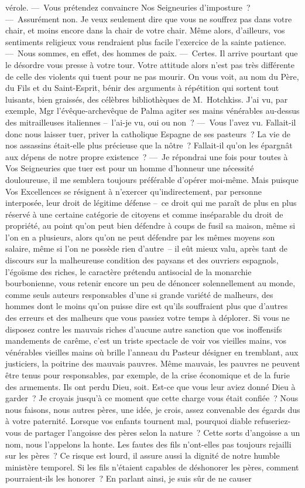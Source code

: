 \documentclass[french,twoside]{book} %
\begin{document}
vérole. — Vous prétendez convaincre Nos Seigneuries d’imposture ? — Assurément non. Je veux seulement dire que vous ne souffrez pas dans votre chair, et moins encore dans la chair de votre chair. Même alors, d’ailleurs, vos sentiments religieux vous rendraient plus facile l’exercice de la sainte patience. — Nous sommes, en effet, des hommes de paix. — Certes. Il arrive pourtant que le désordre vous presse à votre tour. Votre attitude alors n’est pas très différente de celle des violents qui tuent pour ne pas mourir. On vous voit, au nom du Père, du Fils et du Saint-Esprit, bénir des arguments à répétition qui sortent tout luisants, bien graissés, des célèbres bibliothèques de M. Hotchkiss. J’ai vu, par exemple, Mgr l’évêque-archevêque de Palma agiter ses mains vénérables au-dessus des mitrailleuses italiennes – l’ai-je vu, oui ou non ? — Vous l’avez vu. Fallait-il donc nous laisser tuer, priver la catholique Espagne de ses pasteurs ? La vie de nos assassins était-elle plus précieuse que la nôtre ? Fallait-il qu’on les épargnât aux dépens de notre propre existence ? — Je répondrai une fois pour toutes à Vos Seigneuries que tuer est pour un homme d’honneur une nécessité douloureuse, il me semblera toujours préférable d’opérer moi-même. Mais puisque Vos Excellences se résignent à n’exercer qu’indirectement, par personne interposée, leur droit de légitime défense – ce droit qui me paraît de plus en plus réservé à une certaine catégorie de citoyens et comme inséparable du droit de propriété, au point qu’on peut bien défendre à coups de fusil sa maison, même si l’on en a plusieurs, alors qu’on ne peut défendre par les mêmes moyens son salaire, même si l’on ne possède rien d’autre – il eût mieux valu, après tant de discours sur la malheureuse condition des paysans et des ouvriers espagnols, l’égoïsme des riches, le caractère prétendu antisocial de la monarchie bourbonienne, vous retenir encore un peu de dénoncer solennellement au monde, comme seuls auteurs responsables d’une si grande variété de malheurs, des hommes dont le moins qu’on puisse dire est qu’ils souffraient plus que d’autres des erreurs et des malheurs que vous passiez votre temps à déplorer. Si vous ne disposez contre les mauvais riches d’aucune autre sanction que vos inoffensifs mandements de carême, c’est un triste spectacle de voir vos vieilles mains, vos vénérables vieilles mains où brille l’anneau du Pasteur désigner en tremblant, aux justiciers, la poitrine des mauvais pauvres. Même mauvais, les pauvres ne peuvent être tenus pour responsables, par exemple, de la crise économique et de la furie des armements. Ils ont perdu Dieu, soit. Est-ce que vous leur aviez donné Dieu à garder ? Je croyais jusqu’à ce moment que cette charge vous était confiée ? Nous nous faisons, nous autres pères, une idée, je crois, assez convenable des égards dus à votre paternité. Lorsque vos enfants tournent mal, pourquoi diable refuseriez-vous de partager l’angoisse des pères selon la nature ? Cette sorts d’angoisse a un nom, nous l’appelons la honte. Les fautes des fils n’ont-elles pas toujours rejailli sur les pères ? Ce risque est lourd, il assure aussi la dignité de notre humble ministère temporel. Si les fils n’étaient capables de déshonorer les pères, comment pourraient-ils les honorer ? En parlant ainsi, je suis sûr de ne causer 
\end{document}
